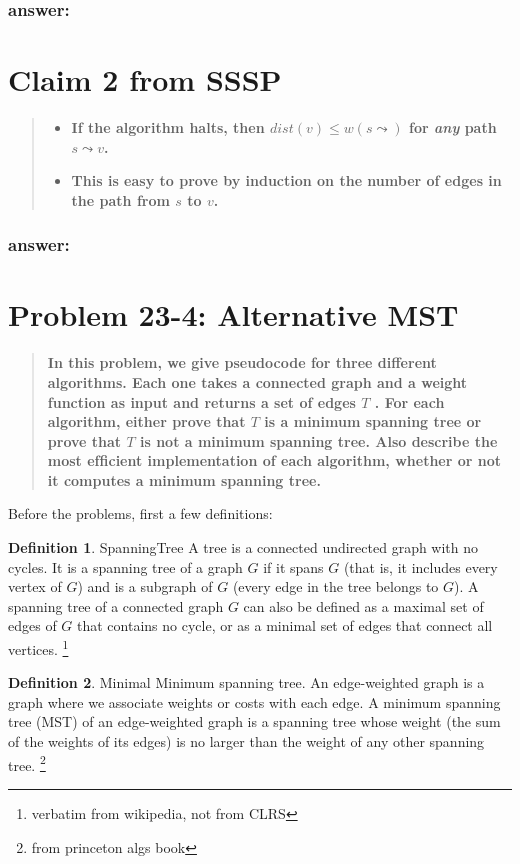 \documentclass[titlepage]{article}\usepackage[]{graphicx}\usepackage[]{color}
\theoremstyle{definition}
\newtheorem{definition}{Definition}[section]
\begin{document}
\subsubsection{answer:}
\vspace{8cm}




\section{Claim 2 from SSSP}
\begin{quote}
\begin{itemize}
  \item \textbf{ If the algorithm halts, then $dist(v) \leq w(s \leadsto )$
	  for \emph{any} path $s \leadsto v$.}
  \item \textbf{This is easy to prove by induction on the number of edges in
	the path from $s$ to $v$.}
\end{itemize}
\end{quote}
\subsubsection{answer:}
\vspace{8cm}



\section{Problem 23-4: Alternative MST}

\begin{quote}
  \textbf{ In this problem, we give pseudocode for three different algorithms.
	Each one takes a connected graph and a weight function as input and returns
	a set of edges $T$ .  For each algorithm, either prove that $T$ is a
	minimum spanning tree or prove that $T$ is not a minimum spanning tree.
	Also describe the most efﬁcient implementation of each algorithm, whether or
	not it computes a minimum spanning tree.  }
\end{quote}

Before the problems, first a few definitions:

\theoremstyle{definition}
\begin{definition}{SpanningTree}
  A tree is a connected undirected graph with no cycles. It is a spanning tree
  of a graph $G$ if it spans $G$ (that is, it includes every vertex of $G$) and is a
  subgraph of $G$ (every edge in the tree belongs to $G$). A spanning tree of a
  connected graph $G$ can also be defined as a maximal set of edges of $G$ that
  contains no cycle, or as a minimal set of edges that connect all vertices.
  \footnote{verbatim from wikipedia, not from CLRS}
\end{definition}
\begin{definition}{Minimal}
  Minimum spanning tree. An edge-weighted graph is a graph where we associate
  weights or costs with each edge. A minimum spanning tree (MST) of an
  edge-weighted graph is a spanning tree whose weight (the sum of the weights
  of its edges) is no larger than the weight of any other spanning tree.
  \footnote{from princeton algs book}
\end{definition}
\end{document}
